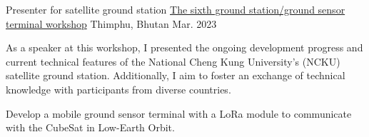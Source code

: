 

\begin{cventries}

  \cventry
    {Presenter for satellite ground station} %
    {\href{https://tech.gov.bt/6th-ground-stationground-sensor-terminal-workshop}{The sixth ground station/ground sensor terminal workshop}} %
    {Thimphu, Bhutan} %
    {Mar. 2023} %
    {
      \begin{cvitems} %
        \item {As a speaker at this workshop, I presented the ongoing development progress and current technical features of the National Cheng Kung University's (NCKU) satellite ground station. Additionally, I aim to foster an exchange of technical knowledge with participants from diverse countries.}
        \item {Develop a mobile ground sensor terminal with a LoRa module to communicate with the CubeSat in Low-Earth Orbit.}
      \end{cvitems}
    }

\end{cventries}
